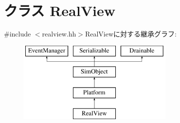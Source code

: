 \hypertarget{classRealView}{
\section{クラス RealView}
\label{classRealView}
}


{\ttfamily \#include $<$realview.hh$>$}RealViewに対する継承グラフ:\begin{figure}[H]
\begin{center}
\leavevmode
\includegraphics[height=4cm]{classRealView}
\end{center}
\end{figure}
